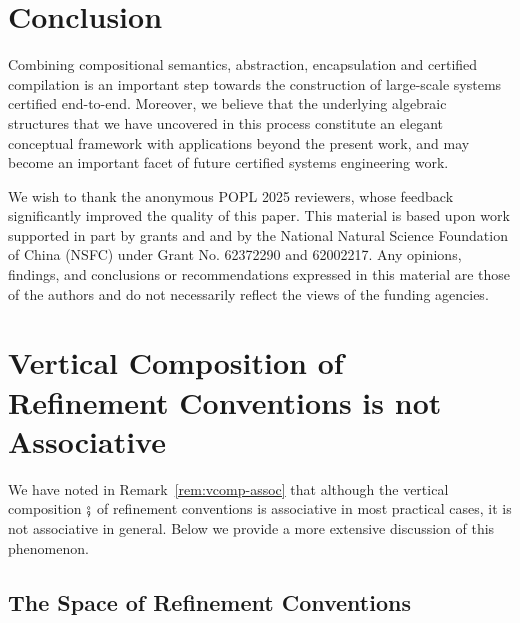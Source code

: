 \documentclass[acmsmall,nonacm]{acmart}
\newenvironment{DIFnomarkup}{}{}
\newcommand{\vcomp}{\fatsemi}
\begin{document}

\section{Conclusion} \label{sec:conclusion} %

Combining compositional semantics,
abstraction,
encapsulation and certified compilation
is an important step towards
the construction of large-scale systems certified end-to-end.
Moreover,
we believe that
the underlying algebraic structures that we have uncovered
in this process
constitute an elegant conceptual framework
with applications beyond the present work,
and may become an important facet of
future certified systems engineering work.


\begin{DIFnomarkup}
\begin{acks}
We wish to thank the anonymous POPL 2025 reviewers,
whose feedback significantly improved the quality of this paper.
This material is based upon work supported in part by
 grants
 and 
 and by the National Natural
Science Foundation of China (NSFC) under Grant No. 62372290 and
62002217.
%
Any opinions, findings, and conclusions or recommendations expressed in this
material are those of the authors and do not necessarily reflect the views of
the funding agencies.
\end{acks}
\end{DIFnomarkup}



\ifdefined\withappendix

\appendix

\newpage

\section{Vertical Composition of Refinement Conventions is not Associative} %

We have noted in Remark~\ref{rem:vcomp-assoc}
that although the vertical composition $\vcomp$ of refinement conventions
is associative in most practical cases,
it is not associative in general.
Below we provide a more extensive
discussion of this phenomenon.

\subsection{The Space of Refinement Conventions} %
\end{document}
